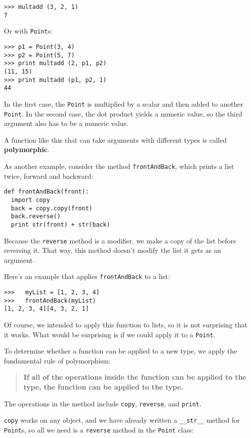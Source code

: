 \beforeverb
\begin{verbatim}
>>> multadd (3, 2, 1)
7
\end{verbatim}
\afterverb
%
Or with {\tt Point}s:

\beforeverb
\begin{verbatim}
>>> p1 = Point(3, 4)
>>> p2 = Point(5, 7)
>>> print multadd (2, p1, p2)
(11, 15)
>>> print multadd (p1, p2, 1)
44
\end{verbatim}
\afterverb
%
In the first case, the {\tt Point} is multiplied by a scalar
and then added to another {\tt Point}.
In the second case, the dot product yields a numeric
value, so the third argument also has to be a numeric value.

A function like this that can take arguments with different
types is called {\bf polymorphic}.

As another example, consider the method {\tt frontAndBack},
which prints a list twice, forward and backward:

\beforeverb
\begin{verbatim}
def frontAndBack(front):
  import copy
  back = copy.copy(front)
  back.reverse()
  print str(front) + str(back)
\end{verbatim}
\afterverb
%
Because the {\tt reverse} method is a modifier, we make a copy
of the list before reversing it.  That way, this method doesn't
modify the list it gets as an argument.

Here's an example that applies {\tt frontAndBack} to a list:

\beforeverb
\begin{verbatim}
>>>   myList = [1, 2, 3, 4]
>>>   frontAndBack(myList)
[1, 2, 3, 4][4, 3, 2, 1]
\end{verbatim}
\afterverb
%
Of course, we intended to apply this function to lists, so
it is not surprising that it works.
What would be surprising is if we could apply it to a {\tt Point}.

To determine whether a function can be applied to a new type,
we apply the fundamental rule of polymorphism:

\begin{quote}
{\bf If all of the operations inside the function can be applied
to the type, the function can be applied to the type.}
\end{quote}

The operations in the method include {\tt copy}, {\tt reverse}, and
{\tt print}.

{\tt copy} works on any object, and we have already written
a {\tt \_\_str\_\_} method for {\tt Point}s, so all we need
is a {\tt reverse} method in the {\tt Point} class:

